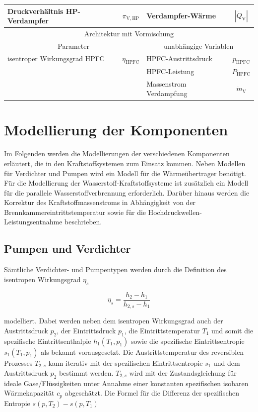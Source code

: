 \begin{table}[ht]
\begin{tabular} {|l|c|l|c|}
    Druckverhältnis HP-Verdampfer & $\pi_\mathrm{V,HP}$ & Verdampfer-Wärme & $|\dot{Q}_\mathrm{V}|$ \\ \hline\hline
    \multicolumn{4}{|c|}{Architektur mit Vormischung}\\ \hline
    \multicolumn{2}{|c}{Parameter} & \multicolumn{2}{|c|}{unabhängige Variablen}\\ \hline\hline%
    isentroper Wirkungsgrad HPFC & $\eta_{\mathrm{HPFC}}$ & HPFC-Austrittsdruck & $p_{\mathrm{HPFC}}$ \\ \hline
    \multicolumn{2}{|c|}{}& HPFC-Leistung & $P_{\mathrm{HPFC}}$ \\ \hline
    \multicolumn{2}{|c|}{}& Massenstrom Verdampfung & $\dot{m}_\mathrm{V}$ \\ \hline
    \end{tabular}	
    \label{Tab:h2_params}%
\end{table}
\FloatBarrier 

\section{Modellierung der Komponenten}

Im Folgenden werden die Modellierungen der verschiedenen Komponenten erläutert, die in den Kraftstoffsystemen zum Einsatz kommen. Neben Modellen für Verdichter und Pumpen wird ein Modell für die Wärmeübertrager benötigt. Für die Modellierung der Wasserstoff-Kraftstoffsysteme ist zusätzlich ein Modell für die parallele Wasserstoffverbrennung erforderlich. Darüber hinaus werden die Korrektur des Kraftstoffmassenstroms in Abhängigkeit von der Brennkammereintrittstemperatur sowie für die Hochdruckwellen-Leistungsentnahme beschrieben.

\subsection{Pumpen und Verdichter}

Sämtliche Verdichter- und Pumpentypen werden durch die Definition des isentropen Wirkungsgrad $\eta_s$

\begin{equation}\label{Eq:isentropic}
	\eta_s=\frac{h_2-h_1}{h_{2,s}-h_1}
\end{equation}

modelliert. Dabei werden neben dem isentropen Wirkungsgrad auch der Austrittsdruck $p_2$, der Eintrittsdruck $p_1$, die Eintrittstemperatur $T_1$ und somit die spezifische Eintrittsenthalpie $h_1(T_1, p_1)$ sowie die spezifische Eintrittsentropie $s_1(T_1, p_1)$ als bekannt vorausgesetzt. Die Austrittstemperatur des reversiblen Prozesses $T_{2,s}$ kann iterativ mit der spezifischen Eintrittsentropie $s_1$ und dem Austrittsdruck $p_2$ bestimmt werden. $T_{2,s}$ wird mit der Zustandsgleichung für ideale Gase/Flüssigkeiten unter Annahme einer konstanten spezifischen isobaren Wärmekapazität $c_p$ abgeschätzt. Die Formel für die Differenz der spezifischen Entropie $s(p,T_2)-s(p, T_1)$

